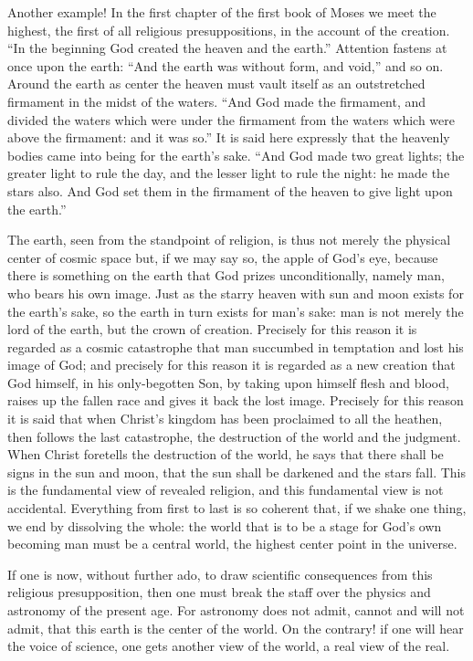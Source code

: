 \documentclass[12pt]{book}
\newcommand{\opage}[1]{\marginnote{\footnotesize\textit{[#1]}}}
\begin{document}
Another example! In the first chapter of the first book of Moses we meet
the highest, the first of all religious presuppositions, in the account
of the creation. ``In the beginning God created the heaven and the
earth.'' Attention fastens at once upon the earth: ``And the earth was
without form, and void,'' and so on. Around the earth as center the
heaven must vault itself as an outstretched firmament in the midst of
the waters. ``And God made the firmament, and divided the waters which
were under the firmament from the waters which were above the firmament:
and it was so.'' It is said here expressly that the heavenly bodies came
into being for the earth's sake. ``And God made two great lights; the
greater light to rule the day, and the lesser light to rule the night:
he made the stars also. And God set them in the firmament of the heaven
to give light upon the earth.''

The earth, seen from the standpoint of religion, is thus not merely the
physical center of cosmic space but, if we may say so, the apple of
God's eye, because there is something on the earth that God prizes
unconditionally, namely man, who bears his own image. Just as the starry
heaven with sun and moon exists for the earth's sake, so the earth in
turn exists for man's sake: man is not merely the lord of the earth, but
the crown of creation. Precisely for this reason it is regarded as a
cosmic catastrophe that man succumbed in temptation and lost his image of
God; and precisely for this reason it is regarded as a new creation that
God himself, in his only-begotten Son, by taking upon himself flesh and
blood, raises up the fallen race and gives it back the lost image.
Precisely for this reason it is said
\opage{65}\setcounter{footnote}{0}%
that when Christ's kingdom has been proclaimed to all the heathen, then
follows the last catastrophe, the destruction of the world and the
judgment. When Christ foretells the destruction of the world, he says
that there shall be signs in the sun and moon, that the sun shall be
darkened and the stars fall. This is the fundamental view of revealed
religion, and this fundamental view is not accidental. Everything from
first to last is so coherent that, if we shake one thing, we end by
dissolving the whole: the world that is to be a stage for God's own
becoming man must be a central world, the highest center point in the
universe.

If one is now, without further ado, to draw scientific consequences from
this religious presupposition, then one must break the staff over the
physics and astronomy of the present age. For astronomy does not admit,
cannot and will not admit, that this earth is the center of the world.
On the contrary! if one will hear the voice of science, one gets another
view of the world, a real view of the real.
\end{document}
